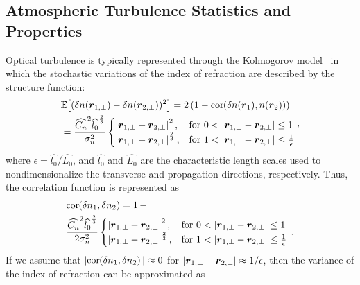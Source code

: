 \documentclass[9pt,twocolumn,twoside]{osajnl}
\def\bm#1{\mbox{\boldmath{$#1$}}}
\def\Expect#1{\mathbb{E}\hspace{-0.03in}\left[ #1 \right]}
\def\cor#1{\mathrm{cor}\hspace{-0.03in}\left(#1 \right)}
\def\vect#1{\bm{#1}}
\begin{document}
\vspace*{-3mm}
\subsection{Atmospheric Turbulence Statistics and Properties}

Optical turbulence is typically represented through the Kolmogorov model~\cite{andrews2005laser} 
in which the stochastic variations of the index of refraction are described by the structure function:
\begin{equation*}
	\begin{split}
		& \Expect{(\delta n(\vect{r}_{1,\perp}) - \delta n(\vect{r}_{2,\perp}))^2} = 2 \left( 1 - \cor{\delta n(\vect{r}_1), n(\vect{r}_2)} \right) \\
		& = \frac{\widehat{C_n}^2 \widehat{l_{0}}^{\frac{2}{3}}}{\sigma_n^2}
			\begin{cases}
				\left|\vect{r}_{1,\perp} - \vect{r}_{2,\perp}\right|^{2}, & \text{for } 0 < \left| \vect{r}_{1,\perp} - \vect{r}_{2,\perp} \right| \leq 1 \\
				\left|\vect{r}_{1,\perp} - \vect{r}_{2,\perp} \right|^{\frac{2}{3}}, & \text{for } 1  < \left| \vect{r}_{1,\perp} - \vect{r}_{2,\perp} \right| \leq  \frac{1}{\epsilon}
			\end{cases}
	\end{split} \, ,
\end{equation*}
where $\epsilon = \widehat{l_0} / \widehat{L_0}$, and $\widehat{l_0}$ and $\widehat{L_0}$ are the characteristic length scales used to nondimensionalize the transverse and propagation directions, respectively.  
Thus, the correlation function is represented as
\begin{equation*}
	\begin{split}
		& \cor{\delta n_1,\delta n_2} = 1 \, - \\
		& \frac{\widehat{C_n}^2 \widehat{l_{0}}^{\frac{2}{3}}}{2 \sigma_n^2}  
		    \begin{cases}
				\left|\vect{r}_{1,\perp} - \vect{r}_{2,\perp} \right|^{2}, & \text{for } 0 < \left| \vect{r}_{1,\perp} - \vect{r}_{2,\perp} \right| \leq 1 \\
				\left|\vect{r}_{1,\perp} - \vect{r}_{2,\perp} \right|^{\frac{2}{3}}, & \text{for } 1  < \left| \vect{r}_{1,\perp} - \vect{r}_{2,\perp} \right| \leq \frac{1}{\epsilon}
			\end{cases} \, .
	\end{split}
\end{equation*}
If we assume that $|\cor{\delta n_1, \delta n_2}| \approx 0$ for $ \left| \vect{r}_{1,\perp} - \vect{r}_{2,\perp} \right| \approx 1/\epsilon$, then the variance of the index of refraction can be approximated as
\end{document}
